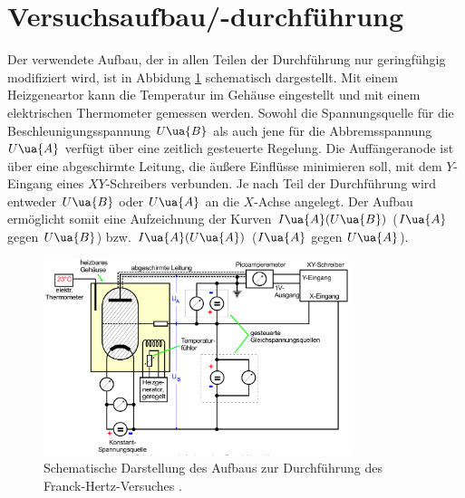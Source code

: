 \section{Versuchsaufbau/-durchführung}
Der verwendete Aufbau, der in allen Teilen der Durchführung nur geringfühgig modifiziert wird, ist in
Abbidung \ref{fig: aufbau} schematisch dargestellt. Mit einem Heizgeneartor kann die Temperatur im Gehäuse
eingestellt und mit einem elektrischen Thermometer gemessen werden. Sowohl die Spannungsquelle für die
Beschleunigungsspannung $U\ua{B}$ als auch jene für die Abbremsspannung $U\ua{A}$ verfügt über
eine zeitlich gesteuerte Regelung. Die Auffängeranode ist über eine abgeschirmte Leitung, die
äußere Einflüsse minimieren soll, mit dem $Y$-Eingang eines $XY$-Schreibers verbunden. Je nach Teil der
Durchführung wird entweder $U\ua{B}$ oder $U\ua{A}$ an die $X$-Achse angelegt. Der Aufbau ermöglicht somit
eine Aufzeichnung der Kurven $I\ua{A}(U\ua{B})$ ($I\ua{A}$ gegen $U\ua{B}$) bzw. $I\ua{A}(U\ua{A})$ ($I\ua{A}$ gegen $U\ua{A}$).
\begin{figure}[H]
  \centering
  \includegraphics[width = 0.8\textwidth]{pics/aufbau.png}
  \caption{Schematische Darstellung des Aufbaus zur Durchführung des Franck-Hertz-Versuches \cite{anleitung601}.}
  \label{fig: aufbau}
\end{figure}

